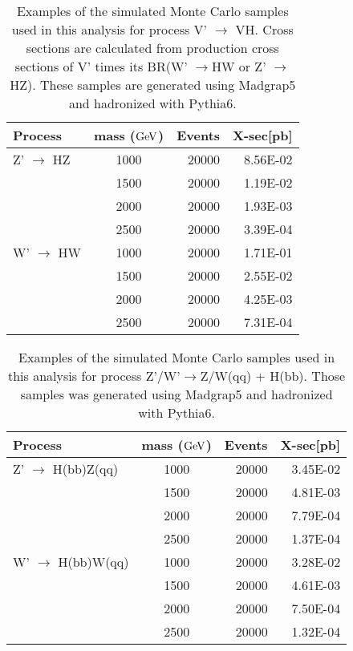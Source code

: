 \begin{table}[htb]
\begin{center}
\begin{tabular}{ |l|c|r|r| }
\hline
Process     & mass ($\mathrm{GeV}$) & Events & X-sec[pb] \\
\hline
Z' $\to$ HZ & 1000   &20000   & 8.56E-02 \\
 & 1500   &20000              & 1.19E-02 \\
 & 2000   &20000              & 1.93E-03 \\
 & 2500  &20000               & 3.39E-04  \\\hline
W' $\to$ HW& 1000   &20000   &  1.71E-01  \\
 & 1500 &20000               &  2.55E-02  \\
 & 2000 &20000               &  4.25E-03  \\
 & 2500  &20000              &  7.31E-04  \\
\hline
\end{tabular}
\end{center}
\caption{Examples of the simulated Monte Carlo samples used in this analysis for process
 V' $\to$ VH. Cross sections are calculated from 
production cross sections of V' times its BR(W' $\to$HW or Z' $\to$ HZ). 
 These samples are generated using Madgrap5 and hadronized with Pythia6. }
\label{table:Hww}
\end{table}


\iffalse

\begin{table}[htb]
\begin{center}
\begin{tabular}{ |l|c|r|r| }
\hline
Process           & mass ($\mathrm{GeV}$) & Events & X-sec[pb] \\
\hline
Z' $\to$ H(bb)Z(qq) & 1000  &20000   & 3.45E-02 \\
 & 1500     &20000   & 4.81E-03 \\
 & 2000    &20000   & 7.79E-04  \\
 & 2500    &20000   & 1.37E-04 \\\hline
W' $\to$ H(bb)W(qq)& 1000  &20000   & 3.28E-02 \\
 & 1500    &20000   & 4.61E-03 \\
 & 2000    &20000   & 7.50E-04 \\
 & 2500     &20000   & 1.32E-04 \\
\hline
\end{tabular}
\end{center}
\caption{Examples of the simulated Monte Carlo samples used in this analysis for process
 Z'/W'$\to$Z/W(qq) + H(bb). Those samples was generated using Madgrap5 and hadronized with Pythia6.}
\label{table:Hbb}
\end{table}

